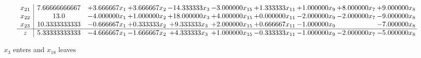 \documentclass[10pt]{article}
\begin{document}
\[\begin{array}{c| c c@{\hskip 2pt} c@{\hskip 2pt} c@{\hskip 2pt} c@{\hskip 2pt} c@{\hskip 2pt} c@{\hskip 2pt} c@{\hskip 2pt} c@{\hskip 2pt} }
 x_{21}   &  7.66666666667 & + 3.666667 x_{1} & + 3.666667 x_{2} & -14.333333 x_{3} & -3.000000 x_{15} & + 1.333333 x_{11} & + 1.000000 x_{9} & + 8.000000 x_{7} & + 9.000000 x_{8}\\
 x_{22}   &  13.0 & -4.000000 x_{1} & + 1.000000 x_{2} & + 18.000000 x_{3} & + 4.000000 x_{15} & + 0.000000 x_{11} & -2.000000 x_{9} & -2.000000 x_{7} & -9.000000 x_{8}\\
 x_{23}   &  10.3333333333 & -0.666667 x_{1} & + 0.333333 x_{2} & + 9.333333 x_{3} & + 2.000000 x_{15} & + 0.666667 x_{11} & -1.000000 x_{9} &   & -7.000000 x_{8}\\
\hline
z    &  5.33333333333 & -4.666667 x_{1} & -1.666667 x_{2} & + 4.333333 x_{3} & + 1.000000 x_{15} & -0.333333 x_{11} & -1.000000 x_{9} & -2.000000 x_{7} & -5.000000 x_{8}\\
\end{array}\]


 $ x_{3} $ enters and $ x_{18} $ leaves 
\end{document}
